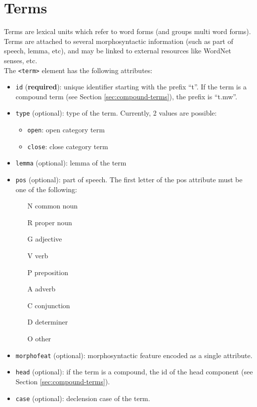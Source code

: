 
\section{Terms}
\label{sec:terms}

Terms are lexical units which refer to word forms (and groups multi word
forms). Terms are attached to several morphosyntactic information (such as
part of speech, lemma, etc), and may be linked to external resources like
WordNet senses, etc.\\

The \texttt{<term>} element has the following attributes:
\begin{itemize}
\item \texttt{id} (\textbf{required}): unique identifier starting with the
  prefix ``t''. If the term is a compound term (see Section
  \ref{sec:compound-terms}), the prefix is ``t.mw''.
\item \texttt{type} (optional): type of the term. Currently, 2 values are
  possible:
  \begin{itemize}
  \item \texttt{open}: open category term
  \item \texttt{close}: close category term
  \end{itemize}
\item \texttt{lemma} (optional): lemma of the term
\item \texttt{pos} (optional): part of speech. The first letter of the pos
  attribute must be one of the following:
  \begin{itemize}
  \item [N] common noun
  \item [R] proper noun
  \item [G] adjective
  \item [V] verb
  \item [P] preposition
  \item [A] adverb
  \item [C] conjunction
  \item [D] determiner
  \item [O] other
  \end{itemize}
\item \texttt{morphofeat} (optional): morphosyntactic feature encoded as a
  single attribute.
\item \texttt{head} (optional): if the term is a compound, the id of the
  head component (see Section \ref{sec:compound-terms}).
\item \texttt{case} (optional): declension case of the term.
\end{itemize}

